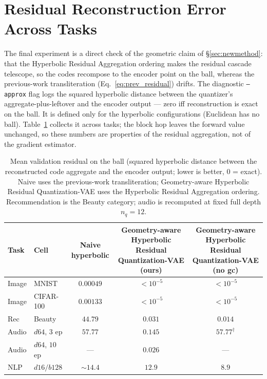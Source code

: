 \documentclass[12pt]{report}
\begin{document}
\section{Residual Reconstruction Error Across Tasks}
\label{sec:exp_approx}

The final experiment is a direct check of the geometric claim of \S\ref{sec:newmethod}: that the Hyperbolic Residual Aggregation ordering makes the residual cascade telescope, so the codes recompose to the encoder point on the ball, whereas the previous-work transliteration (Eq.~\ref{eq:prev_residual}) drifts. The diagnostic \texttt{--approx} flag logs the squared hyperbolic distance between the quantizer's aggregate-plus-leftover and the encoder output --- zero iff reconstruction is exact on the ball. It is defined only for the hyperbolic configurations (Euclidean has no ball). Table~\ref{tab:approx} collects it across tasks; the block hop leaves the forward value unchanged, so these numbers are properties of the residual aggregation, not of the gradient estimator.

\begin{table}[h]
\centering
\caption{Mean validation residual on the ball (squared hyperbolic distance between the reconstructed code aggregate and the encoder output; lower is better, $0$ = exact). Naive uses the previous-work transliteration; Geometry-aware Hyperbolic Residual Quantization-VAE uses the Hyperbolic Residual Aggregation ordering. Recommendation is the Beauty category; audio is recomputed at fixed full depth $n_q=12$.}
\label{tab:approx}
\begin{tabular}{llccc}
\hline
Task & Cell & Naive hyperbolic & Geometry-aware Hyperbolic Residual Quantization-VAE (ours) & Geometry-aware Hyperbolic Residual Quantization-VAE (no gc) \\
\hline
Image  & MNIST            & $0.00049$ & $<\!10^{-5}$ & $<\!10^{-5}$ \\
Image  & CIFAR-100        & $0.00133$ & $<\!10^{-5}$ & $<\!10^{-5}$ \\
Rec    & Beauty           & $44.79$   & $0.031$ & $0.014$ \\
Audio  & $d64$, $3$ ep    & $57.77$   & $0.145$ & $57.77^{\dagger}$ \\
Audio  & $d64$, $10$ ep   & ---       & $0.026$ & --- \\
NLP    & $d16/b128$       & $\sim\!14.4$ & $12.9$ & $8.9$ \\
\hline
\end{tabular}
\end{table}
\end{document}
